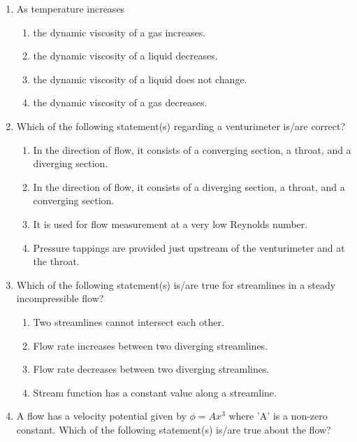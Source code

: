 \documentclass[a4paper,10pt]{article}
\begin{document}
\begin{enumerate}
\item As temperature increases

\hfill{}
\begin{enumerate}
    \item the dynamic viscosity of a gas increases.
    \item the dynamic viscosity of a liquid decreases.
    \item the dynamic viscosity of a liquid does not change.
    \item the dynamic viscosity of a gas decreases.
\end{enumerate}

\item Which of the following statement(s) regarding a venturimeter is/are correct?

\hfill{}
\begin{enumerate}
    \item In the direction of flow, it consists of a converging section, a throat, and a diverging section.
    \item In the direction of flow, it consists of a diverging section, a throat, and a converging section.
    \item It is used for flow measurement at a very low Reynolds number.
    \item Pressure tappings are provided just upstream of the venturimeter and at the throat.
\end{enumerate}

\item Which of the following statement(s) is/are true for streamlines in a steady incompressible flow?

\hfill{}
\begin{enumerate}
    \item Two streamlines cannot intersect each other.
    \item Flow rate increases between two diverging streamlines.
    \item Flow rate decreases between two diverging streamlines.
    \item Stream function has a constant value along a streamline.
\end{enumerate}

\item A flow has a velocity potential given by $\phi = Ax^3$ where 'A' is a non-zero constant. Which of the following statement(s) is/are true about the flow?


\end{enumerate}
\end{document}
